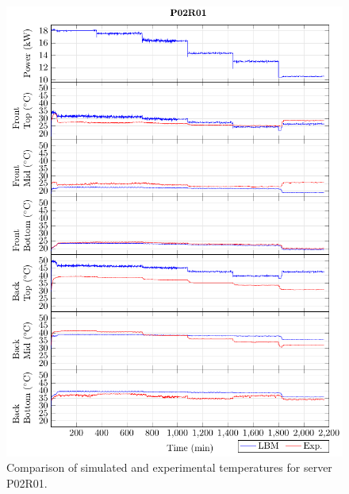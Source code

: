 \documentclass[border=10pt,preview]{standalone}
\begin{document}
\begin{figure}[!htb]
\centering
\includegraphics[width=\linewidth]{Plots/P02R01_T.pdf}
\caption{Comparison of simulated and experimental temperatures for server P02R01.}
\label{fig:P02R01_plot}
\end{figure}

\clearpage
\end{document}
